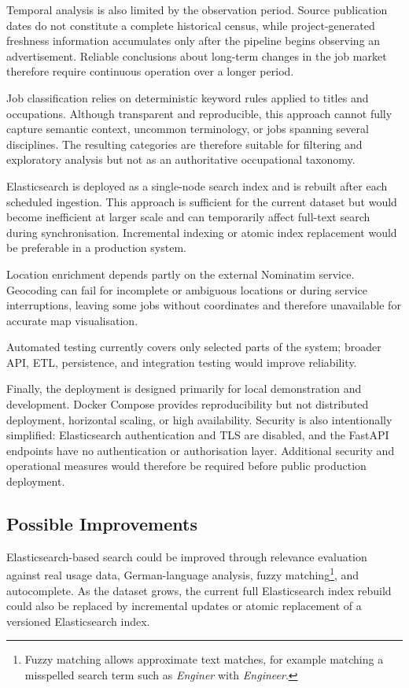 \documentclass[11pt,a4paper]{article}
\begin{document}
Temporal analysis is also limited by the observation period. Source publication dates do not constitute a complete historical census, while project-generated freshness information accumulates only after the pipeline begins observing an advertisement. Reliable conclusions about long-term changes in the job market therefore require continuous operation over a longer period.

Job classification relies on deterministic keyword rules applied to titles and occupations. Although transparent and reproducible, this approach cannot fully capture semantic context, uncommon terminology, or jobs spanning several disciplines. The resulting categories are therefore suitable for filtering and exploratory analysis but not as an authoritative occupational taxonomy.

Elasticsearch is deployed as a single-node search index and is rebuilt after each scheduled ingestion. This approach is sufficient for the current dataset but would become inefficient at larger scale and can temporarily affect full-text search during synchronisation. Incremental indexing or atomic index replacement would be preferable in a production system.

Location enrichment depends partly on the external Nominatim service. Geocoding can fail for incomplete or ambiguous locations or during service interruptions, leaving some jobs without coordinates and therefore unavailable for accurate map visualisation.

Automated testing currently covers only selected parts of the system; broader API, ETL, persistence, and integration testing would improve reliability.

Finally, the deployment is designed primarily for local demonstration and development. Docker Compose provides reproducibility but not distributed deployment, horizontal scaling, or high availability. Security is also intentionally simplified: Elasticsearch authentication and TLS are disabled, and the FastAPI endpoints have no authentication or authorisation layer. Additional security and operational measures would therefore be required before public production deployment.


\subsection{Possible Improvements}

Elasticsearch-based search could be improved through relevance evaluation against real usage data, German-language analysis, fuzzy matching\footnote{Fuzzy matching allows approximate text matches, for example matching a misspelled search term such as \textit{Enginer} with \textit{Engineer}.}, and autocomplete. As the dataset grows, the current full Elasticsearch index rebuild could also be replaced by incremental updates or atomic replacement of a versioned Elasticsearch index.
\end{document}

